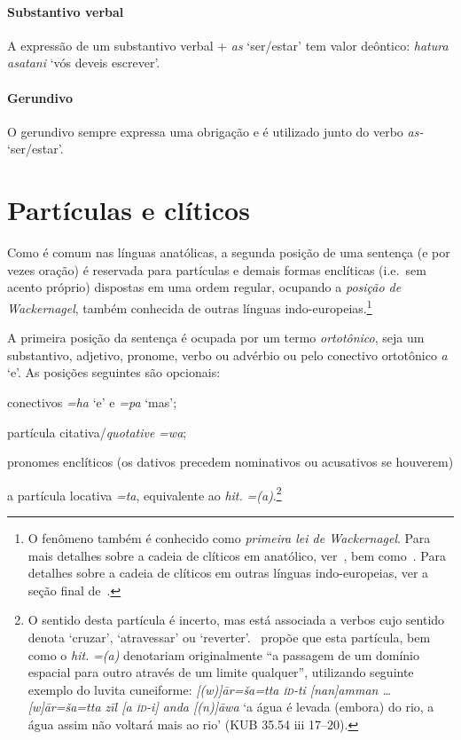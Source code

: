 \paragraph{Substantivo verbal}
A expressão de um substantivo verbal + \emph{as} `ser\slash{}estar' tem valor
deôntico: \emph{hatura asatani} `vós deveis escrever'.

\paragraph{Gerundivo}
O gerundivo sempre expressa uma obrigação e é utilizado junto do verbo \emph{as-} `ser\slash{}estar'.


\section{Partículas e clíticos}

Como é comum nas línguas anatólicas, a segunda posição de uma sentença (e por
vezes oração) é reservada para partículas e demais formas enclíticas  (i.e.\ sem
acento próprio) dispostas em uma ordem regular, ocupando a \emph{posição de Wackernagel}, também conhecida de
outras línguas indo-europeias.\footnote{O fenômeno também é conhecido como
	\emph{primeira lei de Wackernagel}. Para mais detalhes sobre a cadeia de
	clíticos em anatólico, ver~, bem
	como~\citet{Garret1989,Garret1990,AgbayaniGolston2012}.
	Para detalhes sobre a cadeia de clíticos em outras línguas indo-europeias,
	ver a seção final de~\citet{WackernagelsLawI}.
}

A primeira posição da sentença é ocupada por um termo \emph{ortotônico},
seja um substantivo, adjetivo, pronome, verbo ou advérbio ou pelo conectivo
ortotônico \emph{a} `e'.
As posições seguintes são opcionais:
\begin{inparaenum}
	\item[2.] conectivos \emph{=ha} `e' e \emph{=pa} `mas';
	\item[3.] partícula citativa\slash{}\emph{quotative} \emph{=wa};
	\item[4.] pronomes enclíticos (os dativos precedem nominativos ou acusativos
	se houverem)
	\item[5.] a partícula locativa \emph{=ta}, equivalente ao \emph{hit.}
	\emph{={(a)}}.\footnote{O sentido desta partícula é
	incerto, mas está associada a verbos cujo sentido denota `cruzar',
	`atravessar' ou `reverter'.~\citet[419]{Josephson1972} propõe que esta partícula,
	bem como o \emph{hit.} \emph{={(a)}} denotariam originalmente
	``a passagem de um domínio espacial para outro através de um limite
	qualquer'', utilizando seguinte exemplo do luvita cuneiforme:
	\emph{[(w)]ār=ša=tta \textsc{íd}-ti [nan]amman \ldots{} [w]ār=ša=tta zīl [a
	\textsc{íd}-i] anda [(n)]āwa} `a água é levada (embora) do rio, a água assim
	não voltará mais ao rio' (KUB 35.54 iii 17–20).
	}
\end{inparaenum}

